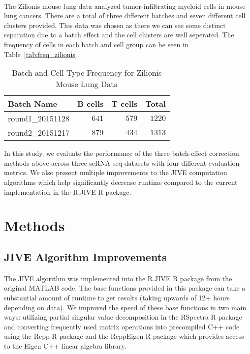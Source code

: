 \documentclass[
12pt, %
letterpaper, %
oneside, %
headinclude,footinclude, %
BCOR5mm, %
]{scrartcl}
\begin{document}
\paragraph*{}
The Zilionis mouse lung data \citep{zilionis2019single} analyzed tumor-infiltrating myeloid cells in mouse lung cancers. There are a total of three different batches and seven different cell clusters provided. This data was chosen as there we can see some distinct separation due to a batch effect and the cell clusters are well seperated. The frequency of cells in each batch and cell group can be seen in Table~\vref{tab:freq_zilionis}.

\begin{table}[ht]
    \caption{Batch and Cell Type Frequency for Zilionis Mouse Lung Data}
    \centering
    \begin{tabular}{lrrr}
        \toprule
        Batch Name & B cells & T cells & Total \\
        \midrule
        round1\_20151128 & $641$ & $579$ & $1220$ \\
        round2\_20151217 & $879$ & $434$ & $1313$ \\
        \bottomrule
        \end{tabular}
    \label{tab:freq_zilionis}
\end{table}

In this study, we evaluate the performance of the three batch-effect correction methods above across three scRNA-seq datasets with four different evaluation metrics. We also present multiple improvements to the JIVE computation algorithms which help significantly decrease runtime compared to the current implementation in the R.JIVE R package.


\section{Methods}

\subsection{JIVE Algorithm Improvements} \label{jive_improvements}

\paragraph*{}
The JIVE algorithm was implemented into the R.JIVE R package \citep{o2016r} from the original MATLAB code. The base functions provided in this package can take a substantial amount of runtime to get results (taking upwards of 12+ hours depending on data). We improved the speed of these base functions in two main ways: utilizing partial singular value decomposition in the RSpectra R package \citep{qiu2019rspectra} and converting frequently used matrix operations into precompiled C++ code using the Rcpp R package \citep{edelbuettel2011rcpp} and the RcppEigen R package \citep{bates2013fast} which provides access to the Eigen C++ linear algebra library.
\end{document}
